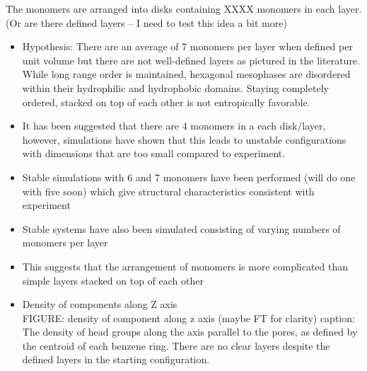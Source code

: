 \documentclass{article}
\begin{document}
	The monomers are arranged into disks containing XXXX monomers in each layer. (Or are there defined layers -- I need to test this idea a bit more) 
	\begin{itemize}
		\item Hypothesis: There are an average of 7 monomers per layer when defined per unit volume but there are not well-defined layers as pictured in the literature. While long range order is maintained, hexagonal mesophases are disordered within their hydrophilic and hydrophobic domains. Staying completely ordered, stacked on top of each other is not entropically favorable.
		\item It has been suggested that there are 4 monomers in a each disk/layer, however, simulations have shown that this leads to unstable configurations with dimensions that are too small compared to experiment.
		\item Stable simulations with 6 and 7 monomers have been performed (will do one with five soon) which give structural characteristics consistent with experiment
		\item Stable systems have also been simulated consisting of varying numbers of monomers per layer
		\item This suggests that the arrangement of monomers is more complicated than simple layers stacked on top of each other
		\item Density of components along Z axis \\
		FIGURE: density of component along z axis (maybe FT for clarity)
		caption: The density of head groups along the axis parallel to the pores, as defined by the centroid of each benzene ring. There are no clear layers despite the defined layers in the starting configuration.
		
	\end{itemize}
	
\end{document}
